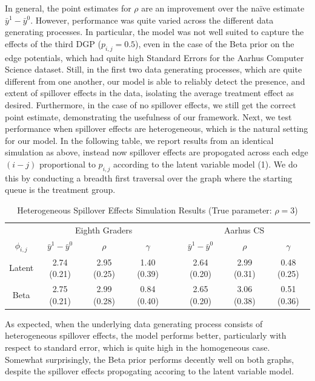 \documentclass{article}
\begin{document}
In general, the point estimates for $\rho$ are an improvement over the naïve estimate $\bar{y}^{1} - \bar{y}^{0}$. However, 
performance was quite varied across the different data generating processes. In particular, the model was not well suited to capture the effects of the third DGP ($p_{i,j} = 0.5$), even in the 
case of the Beta prior on the edge potentials, which had quite high Standard Errors for the Aarhus Computer Science dataset. Still, in the first two data generating processes, 
which are quite different from one another, our model is able to reliably detect the presence, and extent of spillover effects in the data, isolating the average treatment effect as desired. Furthermore, 
in the case of no spillover effects, we still get the correct point estimate, demonstrating the usefulness of our framework. Next, we test performance when spillover effects are heterogeneous, which is the natural setting for our model. In the following table, we report results from an identical simulation as above, instead 
now spillover effects are propogated across each edge $(i-j)$ proportional to $p_{i,j}$ according to the latent variable model (1). We do this by conducting a breadth first traversal over the graph where 
the starting queue is the treatment group. 
\begin{table}[htbp]
  \caption{Heterogeneous Spillover Effects Simulation Results (True parameter: $\rho = 3$)}
  \label{table2}
  \centering
  \begin{tabular}{cccccccc}
    \toprule
    & \multicolumn{3}{c}{Eighth Graders} & & \multicolumn{3}{c}{Aarhus CS}              \\
    \cmidrule{2-4} \cmidrule{6-8}
    $\phi_{i,j}$ & $\bar{y}^1 - \bar{y}^0$ & $\rho$ & $\gamma$ & & $\bar{y}^1 - \bar{y}^0$ & $\rho$ & $\gamma$ \\
    \midrule
     Latent & 2.74 (0.21) & 2.95 (0.25) & 1.40 (0.39) & & 2.64 (0.20) & 2.99 (0.31) & 0.48 (0.25)    \\
    \cmidrule{1-8}
    Beta & 2.75 (0.21) & 2.99 (0.28) & 0.84 (0.40) & & 2.65 (0.20) & 3.06 (0.38) & 0.51 (0.36) \\
    \bottomrule
  \end{tabular}
\end{table}

As expected, when the underlying data generating process consists of heterogeneous spillover effects, the model performs better, particularly with respect 
to standard error, which is quite high in the homogeneous case. Somewhat surprisingly, the Beta prior performs decently well on both graphs, despite the spillover 
effects propogating accoring to the latent variable model. 
\end{document}
